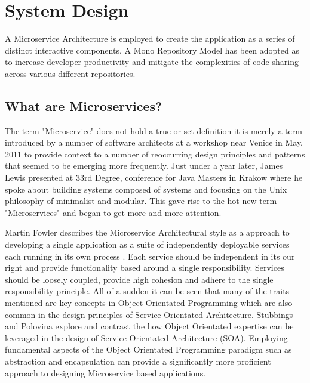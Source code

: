 \chapter{System Design}

A Microservice Architecture is employed to create the application as a series of distinct interactive components. A Mono Repository Model\cite{monorepository} has been adopted as to increase developer productivity and mitigate the complexities of code sharing across various different repositories.

\section{What are Microservices?}
The term "Microservice" does not hold a true or set definition it is merely a term introduced by a number of software architects at a workshop near Venice in May, 2011 to provide context to a number of reoccurring design principles and patterns that seemed to be emerging more frequently.
	Just under a year later, James Lewis presented at 33rd Degree, conference for Java Masters in Krakow where he spoke about building systems composed of systems and focusing on the Unix philosophy of minimalist and modular. \cite{JamesLewis33rdDegree} 
This gave rise to the hot new term "Microservices" and began to get more and more attention. 

Martin Fowler describes the Microservice Architectural style as a approach to developing a single application as a suite of independently deployable services each running in its own process \cite{MicroservicesResourceGuide}. Each service should be independent in its our right and provide functionality based around a single responsibility. Services should be loosely coupled, provide high cohesion and adhere to the single responsibility principle. All of a sudden it can be seen that many of the traits mentioned are key concepts in Object Orientated Programming which are also common in the design principles of Service Orientated Architecture. Stubbings and Polovina \cite{StubbingsPolovina} explore and contrast the how Object Orientated expertise can be leveraged in the design of Service Orientated Architecture (SOA). Employing fundamental aspects of the Object Orientated Programming paradigm such as abstraction and encapsulation can provide a significantly more proficient approach to designing Microservice based applications.

